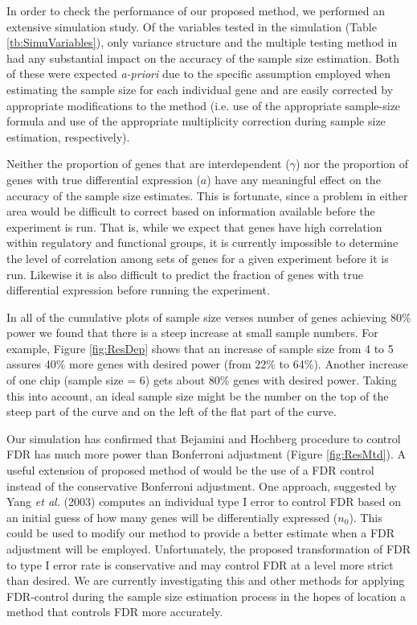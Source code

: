\documentclass{bioinfo}
\begin{document}
In order to check the performance of our proposed method, we
performed an extensive simulation study. Of the variables tested in
the simulation (Table \ref{tb:SimuVariables}), only variance
structure and the multiple testing method in had any substantial
impact on the accuracy of the sample size estimation.  Both of these
were expected \textit{a-priori }due to the specific assumption
employed when estimating the sample size for each individual gene
and are easily corrected by appropriate modifications to the method
(i.e. use of the appropriate sample-size formula and use of the
appropriate multiplicity correction during sample size estimation,
respectively).

Neither the proportion of genes that are interdependent ($\gamma$)
nor the proportion of genes with true differential expression
($a$) have any meaningful effect on the accuracy of the sample
size estimates.  This is fortunate, since a problem in either area
would be difficult to correct based on information available
before the experiment is run.  That is, while we expect that genes
have high correlation within regulatory and functional groups, it
is currently impossible to determine the level of correlation
among sets of genes for a given experiment before it is run.
Likewise it is also difficult to predict the fraction of genes
with true differential expression before running the experiment.

In all of the cumulative plots of sample size verses number of
genes achieving 80\% power we found that there is a steep increase
at small sample numbers. For example, Figure \ref{fig:ResDep}
shows that an increase of sample size from 4 to 5 assures 40\%
more genes with desired power (from 22\% to 64\%).  Another
increase of one chip (sample size = 6) gets about 80\% genes with
desired power. Taking this into account, an ideal sample size
might be the number on the top of the steep part of the curve and
on the left of the flat part of the curve.

Our simulation has confirmed that Bejamini and Hochberg procedure to
control FDR has much more power than Bonferroni adjustment (Figure
\ref{fig:ResMtd}). A useful extension of proposed method of would be
the use of a FDR control instead of the conservative Bonferroni
adjustment. One approach, suggested by Yang \textit{et al.} (2003)
computes an individual type I error to control FDR based on an
initial guess of how many genes will be differentially expressed
($n_0$). This could be used to modify our method to provide a better
estimate when a FDR adjustment will be employed.  Unfortunately, the
proposed transformation of FDR to type I error rate is conservative
and may control FDR at a level more strict than desired. We are
currently investigating this and other methods for applying
FDR-control during the sample size estimation process in the hopes
of location a method that controls FDR more accurately.
\end{document}
